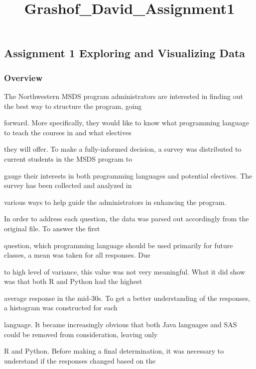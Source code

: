 \documentclass[11pt]{article}
\title{Grashof\_David\_Assignment1}
\begin{document}
    
    
    \maketitle
    
    

    
    \hypertarget{assignment-1-exploring-and-visualizing-data}{%
\subsection{Assignment 1 \textbar{} Exploring and Visualizing
Data}\label{assignment-1-exploring-and-visualizing-data}}

    \hypertarget{overview}{%
\subsubsection{Overview}\label{overview}}

The Northwestern MSDS program administrators are interested in finding
out the best way to structure the program, going

forward. More specifically, they would like to know what programming
language to teach the courses in and what electives

they will offer. To make a fully-informed decision, a survey was
distributed to current students in the MSDS program to

gauge their interests in both programming languages and potential
electives. The survey has been collected and analyzed in

various ways to help guide the administrators in enhancing the program.

In order to address each question, the data was parsed out accordingly
from the original file. To answer the first

question, which programming language should be used primarily for future
classes, a mean was taken for all responses. Due

to high level of variance, this value was not very meaningful. What it
did show was that both R and Python had the highest

average response in the mid-30s. To get a better understanding of the
responses, a histogram was constructed for each

language. It became increasingly obvious that both Java languages and
SAS could be removed from consideration, leaving only

R and Python. Before making a final determination, it was necessary to
understand if the responses changed based on the
\end{document}
